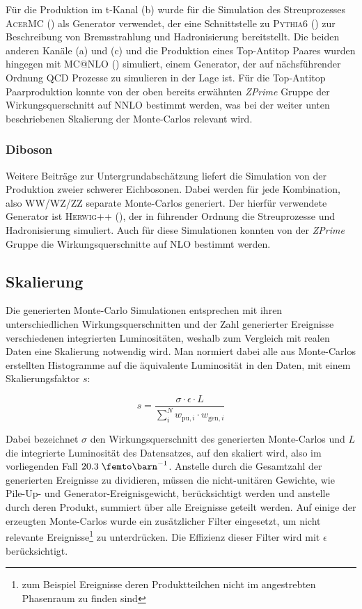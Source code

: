 Für die Produktion im t-Kanal (b) wurde für die Simulation des Streuprozesses
\textsc{AcerMC} (\cite{Kersevan:2004yg}) als Generator verwendet, der eine
Schnittstelle zu \textsc{Pythia6} (\cite{1126-6708-2006-05-026}) zur
Beschreibung von Bremsstrahlung und Hadronisierung bereitstellt. Die beiden
anderen Kanäle (a) und (c) und die Produktion eines Top-Antitop Paares wurden
hingegen mit \textsc{MC@NLO} (\cite{Frixione:2002ik}) simuliert, einem
Generator, der auf nächsführender Ordnung \ac{QCD} Prozesse zu simulieren in
der Lage ist. Für die Top-Antitop Paarproduktion konnte von der oben bereits
erwähnten \textit{ZPrime} Gruppe der Wirkungsquerschnitt auf NNLO bestimmt
werden, was bei der weiter unten beschriebenen Skalierung der Monte-Carlos
relevant wird.

\subsubsection{Diboson}
Weitere Beiträge zur Untergrundabschätzung liefert die Simulation von der
Produktion zweier schwerer Eichbosonen. Dabei werden für jede Kombination, also
WW/WZ/ZZ separate Monte-Carlos generiert. Der hierfür verwendete Generator ist
\textsc{Herwig++} (\cite{Bahr:2008pv}), der in führender Ordnung die
Streuprozesse und Hadronisierung simuliert. Auch für diese Simulationen konnten
von der \textit{ZPrime} Gruppe die Wirkungsquerschnitte auf NLO bestimmt
werden.



\subsection{Skalierung}
Die generierten Monte-Carlo Simulationen entsprechen mit ihren
unterschiedlichen Wirkungsquerschnitten und der Zahl generierter Ereignisse
verschiedenen integrierten Luminositäten, weshalb zum Vergleich mit realen
Daten eine Skalierung notwendig wird. Man normiert dabei alle aus Monte-Carlos
erstellten Histogramme auf die äquivalente Luminosität in den Daten, mit einem
Skalierungsfaktor $s$:

\begin{equation}
    s = \frac{\sigma\cdot\epsilon\cdot L}{\sum_i^N w_{\text{pu},i}\cdot
    w_{\text{gen},i}}
    \label{eq:mc_scaling}
\end{equation}

Dabei bezeichnet $\sigma$ den Wirkungsquerschnitt des generierten Monte-Carlos
und $L$ die integrierte Luminosität des Datensatzes, auf den skaliert wird,
also im vorliegenden Fall $20.3 \fb^{-1}$. Anstelle durch die Gesamtzahl der
generierten Ereignisse zu dividieren, müssen die nicht-unitären Gewichte, wie
Pile-Up- und Generator-Ereignisgewicht, berücksichtigt werden und anstelle
durch deren Produkt, summiert über alle Ereignisse geteilt werden. Auf einige
der erzeugten Monte-Carlos wurde ein zusätzlicher Filter eingesetzt, um nicht
relevante Ereignisse\footnote{zum Beispiel Ereignisse deren Produktteilchen
nicht im angestrebten Phasenraum zu finden sind} zu unterdrücken. Die Effizienz
dieser Filter wird mit $\epsilon$ berücksichtigt.

